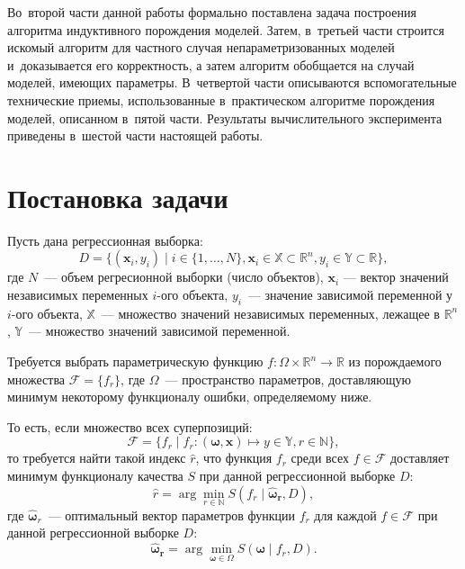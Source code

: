 \documentclass[12pt,a4paper]{amsart}
\begin{document}
Во~второй части данной работы формально поставлена задача построения алгоритма
индуктивного порождения моделей. Затем, в~третьей части строится искомый
алгоритм для частного случая непараметризованных моделей и~доказывается его
корректность, а затем алгоритм обобщается на случай моделей, имеющих параметры.
В~четвертой части описываются вспомогательные технические приемы, использованные
в~практическом алгоритме порождения моделей, описанном в~пятой части. Результаты
вычислительного эксперимента приведены в~шестой части настоящей работы.

\section{Постановка задачи}

Пусть дана регрессионная выборка:
\[
D = \{ (\mathbf{x}_i, y_i) \mid i \in \{1, \dots, N\},
			\mathbf{x}_i \in \mathbb{X} \subset \mathbb{R}^n,
			y_i \in \mathbb{Y} \subset \mathbb{R} \},
\]
где $N$~--- объем регресионной выборки (число объектов), $\mathbf{x}_i$
--- вектор значений независимых переменных $i$-ого объекта, $y_i$~---
значение зависимой переменной у $i$-ого объекта, $\mathbb{X}$~--- множество
значений независимых переменных, лежащее в $\mathbb{R}^n$, $\mathbb{Y}$~---
множество значений зависимой переменной.

Требуется выбрать параметрическую функцию
$f : \Omega \times \mathbb{R}^n \rightarrow \mathbb{R}$ из
порождаемого множества $\mathcal{F} = \{ f_r \}$, где $\Omega$~--- пространство
параметров, доставляющую минимум некоторому функционалу ошибки, определяемому
ниже.

То есть, если множество всех суперпозиций:
\[
\mathcal{F} = \{ f_r \mid
			f_r : (\boldsymbol{\omega}, \mathbf{x}) \mapsto y \in \mathbb{Y},
			r \in \mathbb{N} \},
\]
то требуется найти такой индекс $\hat{r}$, что функция $f_r$ среди всех
$f \in \mathcal{F}$ доставляет минимум функционалу качества $S$ при данной
регрессионной выборке $D$:
\begin{equation}
  \label{eq:hat_r}
  \hat{r} = \arg \min_{r \in \mathbb{N}} S (f_r \mid \boldsymbol{\hat{\omega}_r}, D),
\end{equation}
где $\boldsymbol{\hat{\omega}}_r$~--- оптимальный вектор параметров функции
$f_r$ для каждой $f \in \mathcal{F}$ при данной регрессионной выборке $D$:
\begin{equation}
  \label{eq:hat_omega}
  \boldsymbol{\hat{\omega}_r} = \arg \min_{\boldsymbol{\omega} \in \Omega} S(\boldsymbol{\omega} \mid f_r, D).
\end{equation}
\end{document}
